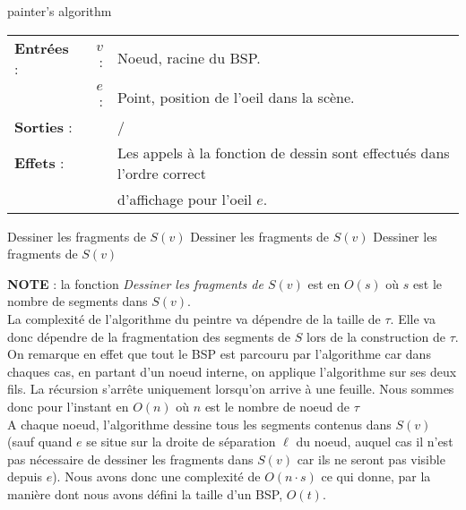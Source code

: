\documentclass[11pts]{article}
\begin{document}
\begin{algorithm}[H]
\caption{painter's algorithm}
\begin{tabular}{lrl}
\textbf{Entrées} : &$v$ : &Noeud, racine du BSP.\\
&$e$ :&Point, position de l'oeil dans la scène.\\[.25cm]
\textbf{Sorties} :& &/\\[.25cm]
\textbf{Effets} :& &Les appels à la fonction de dessin sont effectués dans l'ordre correct\\
& & d'affichage pour l'oeil $e$.\\[.25cm]
\end{tabular}
\begin{algorithmic}[1]
	\State Dessiner les fragments de $S(v)$
\Else
		\State {}
		\State Dessiner les fragments de $S(v)$
		\State {}
		\State {}
		\State Dessiner les fragments de $S(v)$
		\State {}
	\Else
		\State {}
		\State {}
	\EndIf
\EndIf
\EndProcedure
\end{algorithmic}
\end{algorithm}
\noindent\textbf{NOTE} : la fonction \emph{Dessiner les fragments de $S(v)$} est en $O(s)$ où $s$ est le nombre de segments dans $S(v)$.\\[1cm]
La complexité de l'algorithme du peintre va dépendre de la taille de $\tau$. Elle va donc dépendre de la fragmentation des segments de $S$ lors de la construction de $\tau$.\\
On remarque en effet que tout le BSP est parcouru par l'algorithme car dans chaques cas, en partant d'un noeud interne, on applique l'algorithme sur ses deux fils. La récursion s'arrête uniquement lorsqu'on arrive à une feuille. Nous sommes donc pour l'instant en $O(n)$ où $n$ est le nombre de noeud de $\tau$\\[.2cm]
A chaque noeud, l'algorithme dessine tous les segments contenus dans $S(v)$ (sauf quand $e$ se situe sur la droite de séparation $\ell$ du noeud, auquel cas il n'est pas nécessaire de dessiner les fragments dans $S(v)$ car ils ne seront pas visible depuis $e$). Nous avons donc une complexité de $O(n\cdot s)$ ce qui donne, par la manière dont nous avons défini la taille d'un BSP, $O(t)$.
\end{document}
